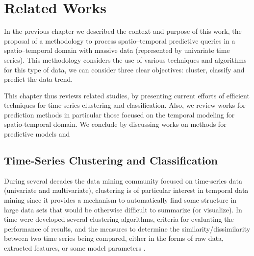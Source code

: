 \chapter{Related Works}
\label{chapter_Related_Works}

In the previous chapter we described the context and purpose of this work, the proposal of a methodology to process spatio--temporal predictive queries in a spatio--temporal domain with massive data (represented by univariate time series). This methodology considers the use of various techniques and algorithms for this type of data, we can consider three clear objectives: cluster, classify and predict the data trend. 

This chapter thus reviews related studies, by presenting current efforts of efficient techniques for time-series clustering and classification. Also, we review works for prediction methods in particular those focused on the temporal modeling for spatio-temporal domain. We conclude by discussing works on methods for predictive models and 

\section{Time-Series Clustering and Classification}
\label{Sec:ClusteringRelatedWorks}

During several decades the data mining community focused on time-series data (univariate and multivariate), clustering is of particular interest in temporal data mining since it provides a mechanism to automatically find some structure in large data sets that would be otherwise difficult to summarize (or visualize). In time were developed several clustering algorithms, criteria for evaluating the performance of results, and the measures to determine the similarity/dissimilarity between two time series being compared, either in the forms of raw data, extracted features, or some model parameters \cite{Liao2005, Aghabozorgi2015}.

